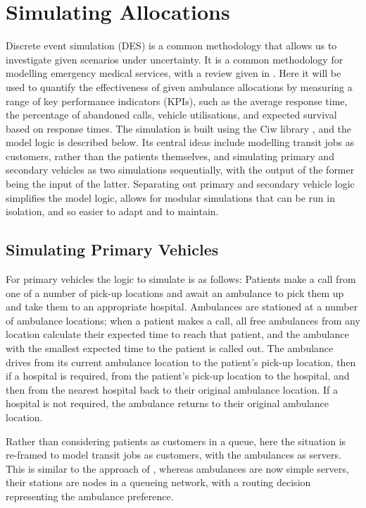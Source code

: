 \documentclass[numbers,webpdf,imaman]{ima-authoring-template}%
\begin{document}
\section{Simulating Allocations}\label{sec:simulation}
Discrete event simulation (DES) is a common methodology that allows us to
investigate given scenarios under uncertainty. It is a common methodology for
modelling emergency medical services, with a review given in
\citet{aboueljinane13}. Here it will be used to quantify the effectiveness of
given ambulance allocations by measuring a range of key performance indicators
(KPIs), such as the average response time, the percentage of abandoned calls,
vehicle utilisations, and expected survival based on response times. The
simulation is built using the Ciw library \citep{palmer2019ciw}, and the model
logic is described below. Its central ideas include modelling transit jobs as
customers, rather than the patients themselves, and simulating primary and
secondary vehicles as two simulations sequentially, with the output of the
former being the input of the latter. Separating out primary and secondary
vehicle logic simplifies the model logic, allows for modular simulations that
can be run in isolation, and so easier to adapt and to maintain.


\subsection{Simulating Primary Vehicles}\label{sec:simulation_primary}
For primary vehicles the logic to simulate is as follows: Patients make a call
from one of a number of pick-up locations and await an ambulance to pick them
up and take them to an appropriate hospital. Ambulances are stationed at a
number of ambulance locations; when a patient makes a call, all free
ambulances from any location calculate their expected time to reach that
patient, and the ambulance with the smallest expected time to the patient is
called out. The ambulance drives from its current ambulance location to the
patient's pick-up location, then if a hospital is required, from the patient's
pick-up location to the hospital, and then from the nearest hospital back to
their original ambulance location. If a hospital is not required, the
ambulance returns to their original ambulance location.

Rather than considering patients as customers in a queue, here the situation
is re-framed to model transit jobs as customers, with the ambulances as
servers. This is similar to the approach of \citet{kergosien15}, whereas
ambulances are now simple servers, their stations are nodes in a queueing
network, with a routing decision representing the ambulance preference.
\end{document}
